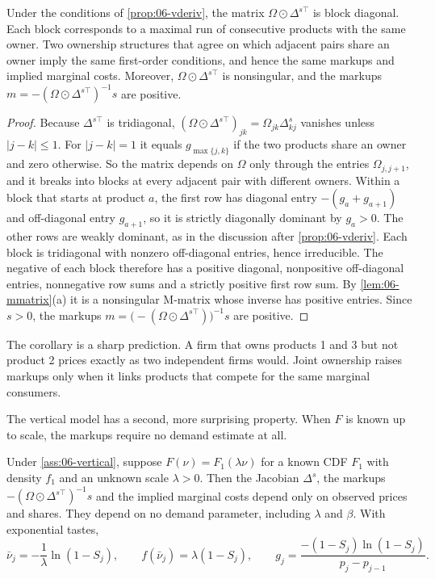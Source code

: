 \begin{corollary}\label{cor:06-neighbors}
Under the conditions of \cref{prop:06-vderiv}, the matrix $\Omega \odot \Delta^{s\top}$ is block diagonal. Each
block corresponds to a maximal run of consecutive products with the same owner. Two ownership structures
that agree on which adjacent pairs share an owner imply the same first-order conditions, and hence the
same markups and implied marginal costs. Moreover, $\Omega \odot \Delta^{s\top}$ is nonsingular, and the markups
$m = -(\Omega \odot \Delta^{s\top})^{-1}s$ are positive.
\end{corollary}

\begin{proof}
Because $\Delta^{s\top}$ is tridiagonal, $(\Omega \odot \Delta^{s\top})_{jk} = \Omega_{jk}\Delta^s_{kj}$ vanishes unless $|j - k| \le 1$.
For $|j - k| = 1$ it equals $g_{\max\{j,k\}}$ if the two products share an owner and zero otherwise. So the
matrix depends on $\Omega$ only through the entries $\Omega_{j,j+1}$, and it breaks into blocks at every
adjacent pair with different owners. Within a block that starts at product $a$, the first row has diagonal
entry $-(g_a + g_{a+1})$ and off-diagonal entry $g_{a+1}$, so it is strictly diagonally dominant by
$g_a > 0$. The other rows are weakly dominant, as in the discussion after \cref{prop:06-vderiv}. Each block
is tridiagonal with nonzero off-diagonal entries, hence irreducible. The negative of each block therefore
has a positive diagonal, nonpositive off-diagonal entries, nonnegative row sums and a strictly positive
first row sum. By \cref{lem:06-mmatrix}(a) it is a nonsingular M-matrix whose inverse has positive entries. Since $s > 0$, the markups $m = \big(-(\Omega \odot \Delta^{s\top})\big)^{-1}s$ are
positive.
\end{proof}

The corollary is a sharp prediction. A firm that owns products 1 and 3 but not product 2 prices exactly
as two independent firms would. Joint ownership raises markups only when it links products that
compete for the same marginal consumers.

The vertical model has a second, more surprising property. When $F$ is known up to scale, the markups
require no demand estimate at all.

\begin{proposition}\label{prop:06-vmarkup-data}
Under \cref{ass:06-vertical}, suppose $F(\nu) = F_1(\lambda\nu)$ for a known CDF $F_1$ with density $f_1$
and an unknown scale $\lambda > 0$. Then the Jacobian $\Delta^s$, the markups $-(\Omega \odot \Delta^{s\top})^{-1}s$ and the
implied marginal costs depend only on observed prices and shares. They depend on no demand parameter,
including $\lambda$ and $\beta$. With exponential tastes,
\begin{equation}\label{eq:06-vexp-g}
  \bar\nu_j = -\frac{1}{\lambda}\ln(1 - S_j), \qquad f(\bar\nu_j) = \lambda(1 - S_j), \qquad
  g_j = \frac{-(1 - S_j)\ln(1 - S_j)}{p_j - p_{j-1}} .
\end{equation}
\end{proposition}

